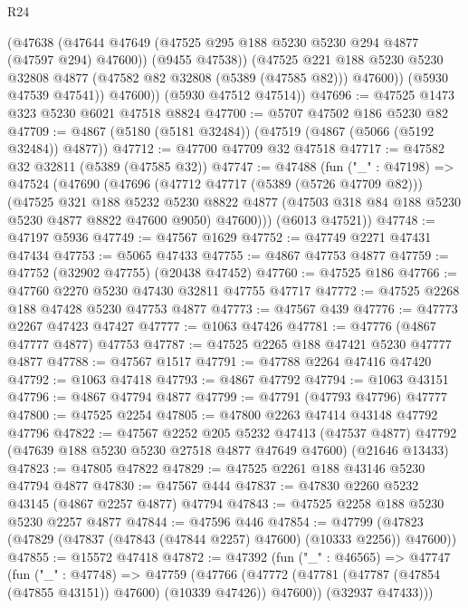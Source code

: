 \begin{lexlean}{R24}
\begin{coremodule}
              (@47638
                (@47644 @47649 (@47525 @295 @188 @5230 @5230 @294 @4877 (@47597 @294) @47600))
                (@9455 @47538))
              (@47525
                @221
                @188
                @5230
                @5230
                @32808
                @4877
                (@47582 @82 @32808 (@5389 (@47585 @82)))
                @47600))
            (@5930 @47539 @47541))
          @47600))
      (@5930 @47512 @47514))
@47696 := @47525 @1473 @323 @5230 @6021 @47518 @8824
@47700 := @5707 @47502 @186 @5230 @82
@47709 := @4867 (@5180 (@5181 @32484)) (@47519 (@4867 (@5066 (@5192 @32484)) @4877))
@47712 := @47700 @47709 @32 @47518
@47717 := @47582 @32 @32811 (@5389 (@47585 @32))
@47747 := @47488
    (fun ("_" : @47198) =>
    @47524
      (@47690
        (@47696
          (@47712 @47717 (@5389 (@5726 @47709 @82)))
          (@47525
            @321
            @188
            @5232
            @5230
            @8822
            @4877
            (@47503 @318 @84 @188 @5230 @5230 @4877 @8822 @47600 @9050)
            @47600)))
      (@6013 @47521))
@47748 := @47197 @5936
@47749 := @47567 @1629
@47752 := @47749 @2271 @47431 @47434
@47753 := @5065 @47433
@47755 := @4867 @47753 @4877
@47759 := @47752 (@32902 @47755) (@20438 @47452)
@47760 := @47525 @186
@47766 := @47760 @2270 @5230 @47430 @32811 @47755 @47717
@47772 := @47525 @2268 @188 @47428 @5230 @47753 @4877
@47773 := @47567 @439
@47776 := @47773 @2267 @47423 @47427
@47777 := @1063 @47426
@47781 := @47776 (@4867 @47777 @4877) @47753
@47787 := @47525 @2265 @188 @47421 @5230 @47777 @4877
@47788 := @47567 @1517
@47791 := @47788 @2264 @47416 @47420
@47792 := @1063 @47418
@47793 := @4867 @47792
@47794 := @1063 @43151
@47796 := @4867 @47794 @4877
@47799 := @47791 (@47793 @47796) @47777
@47800 := @47525 @2254
@47805 := @47800 @2263 @47414 @43148 @47792 @47796
@47822 := @47567
    @2252
    @205
    @5232
    @47413
    (@47537 @4877)
    @47792
    (@47639 @188 @5230 @5230 @27518 @4877 @47649 @47600)
    (@21646 @13433)
@47823 := @47805 @47822
@47829 := @47525 @2261 @188 @43146 @5230 @47794 @4877
@47830 := @47567 @444
@47837 := @47830 @2260 @5232 @43145 (@4867 @2257 @4877) @47794
@47843 := @47525 @2258 @188 @5230 @5230 @2257 @4877
@47844 := @47596 @446
@47854 := @47799 (@47823 (@47829 (@47837 (@47843 (@47844 @2257) @47600) (@10333 @2256)) @47600))
@47855 := @15572 @47418
@47872 := @47392
    (fun ("_" : @46565) =>
    @47747
      (fun ("_" : @47748) =>
      @47759
        (@47766 (@47772 (@47781 (@47787 (@47854 (@47855 @43151)) @47600) (@10339 @47426)) @47600))
        (@32937 @47433)))

\end{coremodule}
\end{lexlean}
